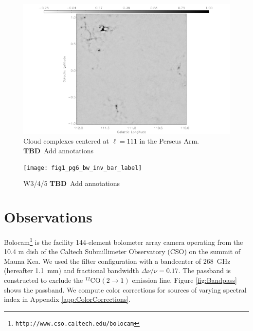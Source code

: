 \documentclass[12pt,preprint]{aastex}
\newcommand{\lon}{\ensuremath{\ell}}
\newcommand{\TBD}{{\bf TBD}}
\begin{document}
\addtocounter{figure}{-1}
\addtocounter{subfig}{1}

\begin{figure}
\hspace{-0.5in}
  \includegraphics[scale=0.8]{fig1_pg4_bw_inv_bar_label} 
  \caption{Cloud complexes centered at $\lon=111$ in the Perseus Arm. \TBD\ Add annotations}
\end{figure}

\addtocounter{figure}{-1}
\addtocounter{subfig}{1}

\begin{figure}
  \hspace{-1in}
  \texttt{[image: fig1\_pg6\_bw\_inv\_bar\_label]} 
  \caption{W3/4/5 \TBD\ Add annotations}
\end{figure}

\renewcommand{\thefigure}{\arabic{figure}}

\clearpage

\section{Observations}
\label{sec:Observations}

Bolocam\footnote{{\tt http://www.cso.caltech.edu/bolocam}} is the
facility 144-element bolometer array camera operating from the 10.4 m
dish of the Caltech Submillimeter Observatory (CSO) on the summit of
Mauna Kea.  We used the filter configuration with a bandcenter of
268~GHz (hereafter 1.1~mm) and fractional bandwidth $\Delta \nu/\nu =
0.17$.  The passband is constructed to exclude the $^{12}\mathrm{CO}(2
\to 1)$ emission line.  Figure \ref{fig:Bandpass} shows the passband.
We compute color corrections for sources of varying spectral index in
Appendix \ref{app:ColorCorrections}.
\end{document}
